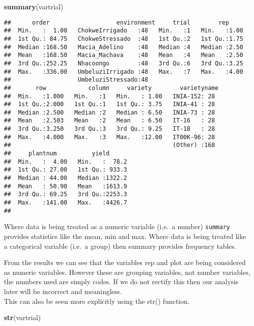 \documentclass[]{book}
\newenvironment{Shaded}{\begin{snugshade}}{\end{snugshade}}
\newcommand{\KeywordTok}[1]{\textcolor[rgb]{0.13,0.29,0.53}{\textbf{#1}}}
\newcommand{\NormalTok}[1]{#1}
\theoremstyle{definition}
\theoremstyle{definition}
\theoremstyle{definition}
\theoremstyle{remark}
\begin{document}
\begin{Shaded}
\begin{Highlighting}[]
\KeywordTok{summary}\NormalTok{(vartrial)}
\end{Highlighting}
\end{Shaded}

\begin{verbatim}
##      order                   environment     trial        rep      
##  Min.   :  1.00   ChokweIrrigado   :48   Min.   :1   Min.   :1.00  
##  1st Qu.: 84.75   ChokweStressado  :48   1st Qu.:2   1st Qu.:1.75  
##  Median :168.50   Macia_Adelino    :48   Median :4   Median :2.50  
##  Mean   :168.50   Macia_Machava    :48   Mean   :4   Mean   :2.50  
##  3rd Qu.:252.25   Nhacoongo        :48   3rd Qu.:6   3rd Qu.:3.25  
##  Max.   :336.00   UmbeluziIrrigado :48   Max.   :7   Max.   :4.00  
##                   UmbeluziStressado:48                             
##       row            column     variety        varietyname 
##  Min.   :1.000   Min.   :1   Min.   : 1.00   INIA-152: 28  
##  1st Qu.:2.000   1st Qu.:1   1st Qu.: 3.75   INIA-41 : 28  
##  Median :2.500   Median :2   Median : 6.50   INIA-73 : 28  
##  Mean   :2.503   Mean   :2   Mean   : 6.50   IT-16   : 28  
##  3rd Qu.:3.250   3rd Qu.:3   3rd Qu.: 9.25   IT-18   : 28  
##  Max.   :4.000   Max.   :3   Max.   :12.00   IT00K-96: 28  
##                                              (Other) :168  
##     plantnum          yield       
##  Min.   :  4.00   Min.   :  78.2  
##  1st Qu.: 27.00   1st Qu.: 933.3  
##  Median : 44.00   Median :1322.2  
##  Mean   : 50.90   Mean   :1613.9  
##  3rd Qu.: 69.25   3rd Qu.:2253.3  
##  Max.   :141.00   Max.   :4426.7  
## 
\end{verbatim}

Where data is being treated as a numeric variable (i.e.~a number)
\texttt{summary} provides statistics like the mean, min and max. Where
data is being treated like a categorical variable (i.e.~a group) then
summary provides frequency tables.

From the results we can see that the variables rep and plot are being
considered as numeric variables. However these are grouping variables,
not number variables, the numbers used are simply codes. If we do not
rectify this then our analysis later will be incorrect and
meaningless.\\
This can also be seen more explicitly using the str() function.

\begin{Shaded}
\begin{Highlighting}[]
\KeywordTok{str}\NormalTok{(vartrial)}
\end{Highlighting}
\end{Shaded}
\end{document}
